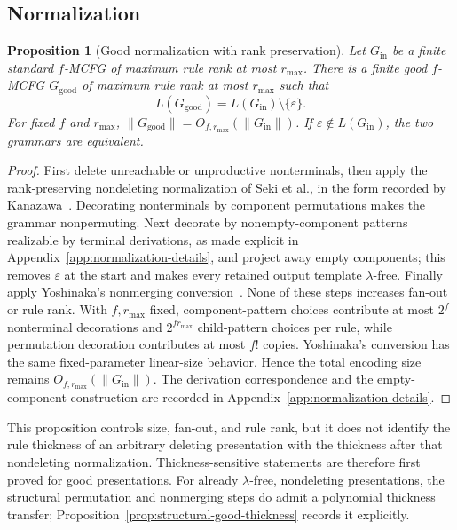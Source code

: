 \documentclass[11pt]{article}
\numberwithin{equation}{section}
\theoremstyle{plain}
\newtheorem{proposition}[theorem]{Proposition}
\theoremstyle{definition}
\theoremstyle{remark}
\newcommand{\eps}{\varepsilon}
\begin{document}
\subsection{Normalization}

\begin{proposition}[Good normalization with rank preservation]
\label{prop:good-normalization}
Let $G_{\mathrm{in}}$ be a finite standard $f$-MCFG of maximum rule rank at
most $r_{\max}$.  There is a finite good $f$-MCFG $G_{\mathrm{good}}$ of
maximum rule rank at most $r_{\max}$ such that
\[
  L(G_{\mathrm{good}})=L(G_{\mathrm{in}})\setminus\{\eps\}.
\]
For fixed $f$ and $r_{\max}$,
$\|G_{\mathrm{good}}\|=O_{f,r_{\max}}(\|G_{\mathrm{in}}\|)$.
If $\eps\notin L(G_{\mathrm{in}})$, the two grammars are equivalent.
\end{proposition}

\begin{proof}
First delete unreachable or unproductive nonterminals, then apply the
rank-preserving nondeleting normalization of Seki et al., in the form recorded by
Kanazawa~\cite[proof of Lemma~2.2]{SekiEtAl1991}\cite[Section~2.1]{Kanazawa2019Ogden}.
Decorating nonterminals by component permutations makes the grammar
nonpermuting.  Next decorate by nonempty-component patterns realizable by terminal
derivations, as made explicit in Appendix~\ref{app:normalization-details}, and
project away empty components; this removes $\eps$ at the start and makes every
retained output template $\lambda$-free.  Finally apply Yoshinaka's nonmerging
conversion~\cite[Section~2.3, Lemma~1]{Yoshinaka2011}.
None of these steps increases fan-out or rule rank.  With $f,r_{\max}$ fixed,
component-pattern choices contribute at most $2^f$ nonterminal decorations and
$2^{f r_{\max}}$ child-pattern choices per rule, while permutation decoration
contributes at most $f!$ copies.  Yoshinaka's conversion has the same
fixed-parameter linear-size behavior.  Hence the total encoding size remains
$O_{f,r_{\max}}(\|G_{\mathrm{in}}\|)$.  The derivation correspondence and the
empty-component construction are recorded in
Appendix~\ref{app:normalization-details}.
\end{proof}

This proposition controls size, fan-out, and rule rank, but it does not identify
the rule thickness of an arbitrary deleting presentation with the thickness
after that nondeleting normalization.  Thickness-sensitive statements are
therefore first proved for good presentations.  For already $\lambda$-free,
nondeleting presentations, the structural permutation and nonmerging steps do
admit a polynomial thickness transfer; Proposition~\ref{prop:structural-good-thickness}
records it explicitly.
\end{document}
